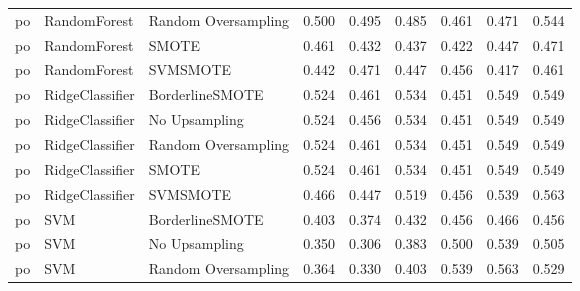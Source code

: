 \begin{tabular}{lllllllll}
      po &                 RandomForest & Random Oversampling & 0.500 &                     0.495 &                 0.485 &                  0.461 &                                   0.471 &     0.544 \\
      po &                 RandomForest &               SMOTE & 0.461 &                     0.432 &                 0.437 &                  0.422 &                                   0.447 &     0.471 \\
      po &                 RandomForest &            SVMSMOTE & 0.442 &                     0.471 &                 0.447 &                  0.456 &                                   0.417 &     0.461 \\
      po &              RidgeClassifier &     BorderlineSMOTE & 0.524 &                     0.461 &                 0.534 &                  0.451 &                                   0.549 &     0.549 \\
      po &              RidgeClassifier &       No Upsampling & 0.524 &                     0.456 &                 0.534 &                  0.451 &                                   0.549 &     0.549 \\
      po &              RidgeClassifier & Random Oversampling & 0.524 &                     0.461 &                 0.534 &                  0.451 &                                   0.549 &     0.549 \\
      po &              RidgeClassifier &               SMOTE & 0.524 &                     0.461 &                 0.534 &                  0.451 &                                   0.549 &     0.549 \\
      po &              RidgeClassifier &            SVMSMOTE & 0.466 &                     0.447 &                 0.519 &                  0.456 &                                   0.539 &     0.563 \\
      po &                          SVM &     BorderlineSMOTE & 0.403 &                     0.374 &                 0.432 &                  0.456 &                                   0.466 &     0.456 \\
      po &                          SVM &       No Upsampling & 0.350 &                     0.306 &                 0.383 &                  0.500 &                                   0.539 &     0.505 \\
      po &                          SVM & Random Oversampling & 0.364 &                     0.330 &                 0.403 &                  0.539 &                                   0.563 &     0.529 \\

\end{tabular}
